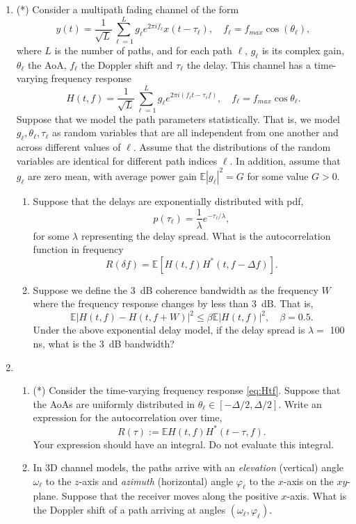 \documentclass[11pt]{article}
\def\beq{\begin{equation}}
\def\eeq{\end{equation}}
\def\Exp{\mathbb{E}}
\begin{document}
\begin{enumerate}
\item (*) Consider a multipath fading channel of the form
\[
    y(t) = \frac{1}{\sqrt{L}}\sum_{\ell = 1}^L g_\ell
        e^{2\pi if_\ell} x(t-\tau_\ell), \quad f_\ell = f_{max}\cos(\theta_\ell),
\]
where $L$ is the number of paths, and for each path $\ell$,
$g_\ell$ is its complex gain, $\theta_\ell$ the AoA, $f_\ell$ the Doppler shift
and $\tau_\ell$ the delay.  This channel has a time-varying frequency response
\beq \label{eq:Htf}
    H(t,f) = \frac{1}{\sqrt{L}}
    \sum_{\ell =1}^L g_\ell e^{2\pi  i(f_\ell t - \tau_\ell f)},
    \quad f_\ell = f_{max}\cos\theta_\ell.
\eeq
Suppose that we model the path parameters statistically.  That is,
we model $g_\ell,\theta_\ell,\tau_\ell$ as random variables that
are all independent
from one another and across different values of $\ell$.  Assume that the
distributions of the random variables are identical for different
path indices $\ell$.
In addition, assume that
$g_\ell$ are zero mean, with average power gain
$\Exp|g_\ell|^2 = G$ for some value $G > 0$.

\begin{enumerate}[label=(\alph*)]
\item Suppose that the delays are exponentially distributed with pdf,
\[
    p(\tau_\ell) = \frac{1}{\lambda}e^{-\tau_\ell/\lambda},
\]
for some $\lambda$ representing the delay spread.
What is the autocorrelation function in frequency
\[
    R(\delta f) = \Exp\left[ H(t,f)H^*(t,f-\Delta f) \right].
\]

\item Suppose we define the 3~dB coherence bandwidth as the frequency $W$
where the frequency response changes by less than 3~dB.  That is,
\[
    \Exp|H(t,f)-H(t,f+W)|^2 \leq \beta \Exp|H(t,f)|^2, \quad \beta = 0.5.
\]
Under the above exponential delay model,
if the delay spread is $\lambda =$ 100 ns, what is the 3~dB bandwidth?
\end{enumerate}

\item
\begin{enumerate}[label=(\alph*)]
\item (*) Consider the time-varying frequency response \eqref{eq:Htf}.
Suppose that the AoAs are uniformly distributed in $\theta_\ell \in [-\Delta/2,\Delta/2]$.
Write an expression for the autocorrelation over time,
\[
    R(\tau) := \Exp H(t,f)H^*(t-\tau,f).
\]
Your expression should have an integral.  Do not evaluate this integral.

\item In 3D channel models, the paths arrive with an \emph{elevation} (vertical)
angle $\omega_\ell$ to the $z$-axis
and \emph{azimuth} (horizontal) angle $\varphi_\ell$ to the $x$-axis on the
$xy$-plane.
Suppose that the receiver moves along the positive $x$-axis.  What is the Doppler
shift of a path arriving at angles $(\omega_\ell,\varphi_\ell)$.

\end{enumerate}

\end{enumerate}
\end{document}
